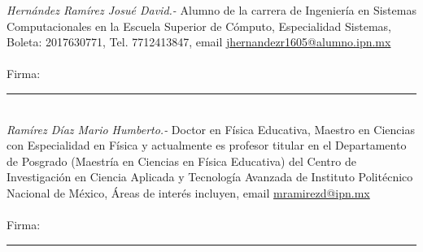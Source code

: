 \documentclass[letterpaper, 10pt]{article}
\begin{document}
\begin{multicols*}{2}
    \textit{Hernández Ramírez Josué David.- }Alumno de la carrera de Ingeniería en Sistemas Computacionales en la Escuela Superior de Cómputo, Especialidad Sistemas, Boleta: 2017630771, Tel. 7712413847, email \url{jhernandezr1605@alumno.ipn.mx} \\ \\
    
    Firma: \rule{7cm}{1pt}
    \vspace{5mm} %
    \\
    \textit{Ramírez Díaz Mario Humberto.- }Doctor en Física Educativa, Maestro en Ciencias con Especialidad en Física y actualmente es profesor titular en el Departamento de Posgrado (Maestría en Ciencias en Física Educativa) del Centro de Investigación en Ciencia Aplicada y Tecnología Avanzada de Instituto Politécnico Nacional de México, Áreas de interés incluyen, email \url{mramirezd@ipn.mx} \\ \\
    
    Firma: \rule{7cm}{1pt}
\end{multicols*}
\end{document}
